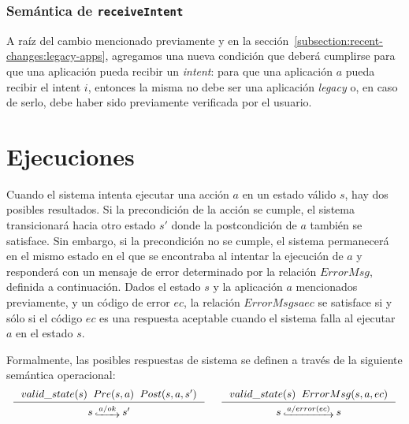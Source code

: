 \subsubsection{Semántica de \texttt{receiveIntent}}

A raíz del cambio mencionado previamente y en la sección~\ref{subsection:recent-changes:legacy-apps},
agregamos una nueva condición que deberá cumplirse para que una aplicación pueda recibir un
\textit{intent}: para que una aplicación $a$ pueda recibir el intent $i$, entonces la misma no debe
ser una aplicación \textit{legacy} o, en caso de serlo, debe haber sido previamente verificada por el
usuario.



\section{Ejecuciones}
Cuando el sistema intenta ejecutar una acción $a$ en un estado válido $s$, hay dos posibles
resultados. Si la precondición de la acción se cumple, el sistema transicionará hacia otro estado $s'$
donde la postcondición de $a$ también se satisface. Sin embargo, si la precondición no se cumple, el
sistema permanecerá en el mismo estado en el que se encontraba al intentar la ejecución de $a$ y
responderá con un mensaje de error determinado por la relación $ErrorMsg$, definida a continuación.
Dados el estado $s$ y la aplicación $a$ mencionados previamente, y un código de error $ec$, la
relación $ErrorMsg s a ec$ se satisface si y sólo si el código $ec$ es una respuesta aceptable cuando
el sistema falla al ejecutar $a$ en el estado $s$.

Formalmente, las posibles respuestas de sistema se definen a través de la siguiente semántica operacional:
\begin{displaymath}
    \begin{array}{c}
        \inference[]{$$valid\_state(s)$$ \hspace{.2cm} $$Pre(s, a)$$ \hspace{.2cm} $$Post(s, a, s')$$}{$$s\step{a/ok}s'$$}
        \hspace{0.5cm}
        \inference[]{$$valid\_state(s)$$ \hspace{.2cm} $$ErrorMsg(s, a, ec)$$}{$$s\step{a/error(ec)}s$$}
    \end{array}
\end{displaymath}


